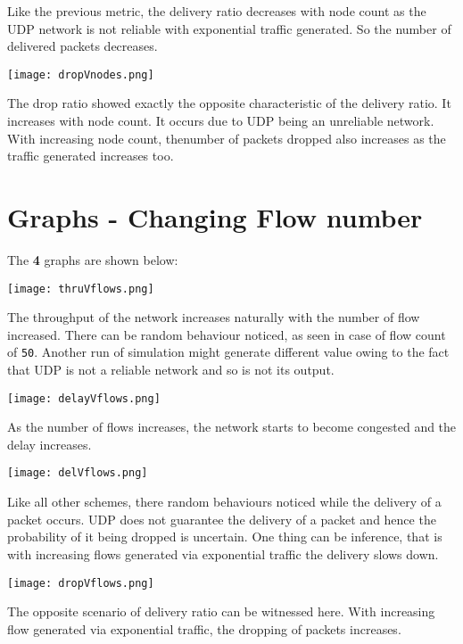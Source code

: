 \documentclass{article}
\begin{document}
Like the previous metric, the delivery ratio decreases with node count as the UDP network is not reliable with exponential traffic generated. So the number of delivered packets decreases. 

\begin{center}
    \texttt{[image: dropVnodes.png]}
\end{center}

The drop ratio showed exactly the opposite characteristic of the delivery ratio. It increases with node count. It occurs due to UDP being an unreliable network. With increasing node count, thenumber of packets dropped also increases as the traffic generated increases too.

\section{Graphs - Changing Flow number}
The \textbf{4} graphs are shown below:

\begin{center}
    \texttt{[image: thruVflows.png]}
\end{center}

The throughput of the network increases naturally with the number of flow increased. There can be random behaviour noticed, as seen in case of flow count of \texttt{50}. Another run of simulation might generate different value owing to the fact that UDP is not a reliable network and so is not its output.

\begin{center}
    \texttt{[image: delayVflows.png]}
\end{center}

As the number of flows increases, the network starts to become congested and the delay increases.

\begin{center}
    \texttt{[image: delVflows.png]}
\end{center}

Like all other schemes, there random behaviours noticed while the delivery of a packet occurs. UDP does not guarantee the delivery of a packet and hence the probability of it being dropped is uncertain. One thing can be inference, that is with increasing flows generated via exponential traffic the delivery slows down.

\begin{center}
    \texttt{[image: dropVflows.png]}
\end{center}

The opposite scenario of delivery ratio can be witnessed here. With increasing flow generated via exponential traffic, the dropping of packets increases.
\end{document}
